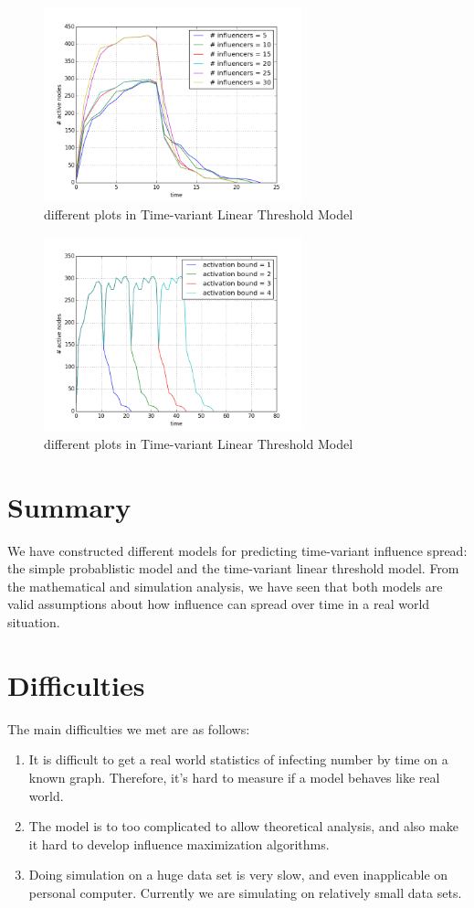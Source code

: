 \documentclass{article}
\begin{document}
\begin{figure}[H]
\centering
\includegraphics[width=7.5cm]{yzplot3.png}
\caption{different plots in Time-variant Linear Threshold Model}
\end{figure}

\begin{figure}[H]
\centering
\includegraphics[width=7.5cm]{yzplot4.png}
\caption{different plots in Time-variant Linear Threshold Model}
\end{figure}

\section{Summary}
We have constructed different models for predicting time-variant influence spread: the simple probablistic model and the time-variant linear threshold model. From the mathematical and simulation analysis, we have seen that both models are valid assumptions about how influence can spread over time in a real world situation. 

\section{Difficulties}
The main difficulties we met are as follows:
\begin{enumerate}
\item It is difficult to get a real world statistics of infecting number by time on a known graph. Therefore, it's hard to measure if a model behaves like real world.
\item The model is to too complicated to allow theoretical analysis, and also make it hard to develop influence maximization algorithms.
\item Doing simulation on a huge data set is very slow, and even inapplicable on personal computer. Currently we are simulating on relatively small data sets.
\end{enumerate}
\end{document}
